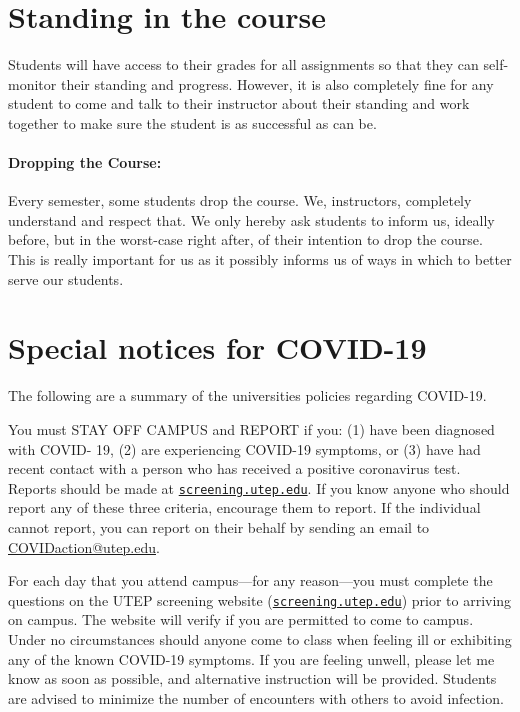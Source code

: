 \documentclass[12pt]{scrartcl}
\begin{document}
\section{Standing in the course}

Students will have access to their grades for all assignments so that they can self-monitor their standing and progress. 
However, it is also completely fine for any student to come and talk to their instructor about their standing and work together to make sure the student is as successful as can be.

\paragraph{Dropping the Course:} 
Every semester, some students drop the course. We, instructors, completely understand and respect that. We only hereby ask students to inform us, ideally before, but in the worst-case right after, of their intention to drop the course. This is really important for us as it possibly informs us of ways in which to better serve our students.


\section{Special notices for COVID-19}

The following are a summary of the universities policies regarding COVID-19.

You must STAY OFF CAMPUS and REPORT if you:
(1) have been diagnosed with COVID- 19, 
(2) are experiencing COVID-19 symptoms, or 
(3) have had recent contact with a person who has received a positive coronavirus test. 
Reports should be made at \href{http://screening.utep.edu}{\texttt{screening.utep.edu}}. 
If you know anyone who should report any of these three criteria, encourage them to report. 
If the individual cannot report, you can report on their behalf by sending an email to \url{COVIDaction@utep.edu}.

For each day that you attend campus—for any reason—you must complete the questions on the UTEP screening website (\href{http://screening.utep.edu}{\texttt{screening.utep.edu}}) prior to arriving on campus. 
The website will verify if you are permitted to come to campus. 
Under no circumstances should anyone come to class when feeling ill or exhibiting any of the known COVID-19 symptoms. 
If you are feeling unwell, please let me know as soon as possible, 
and alternative instruction will be provided. Students are advised to minimize the number of encounters with others to avoid infection.
\end{document}
